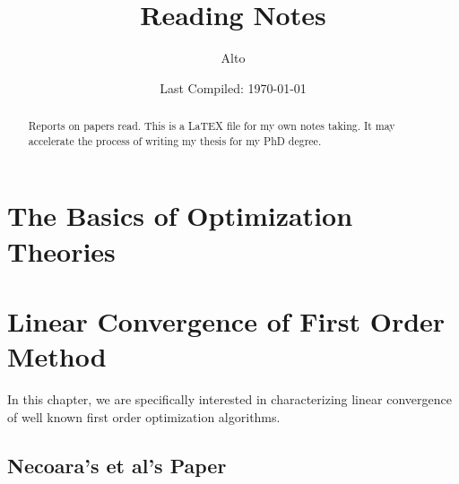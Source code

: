\documentclass[12pt]{report}
\begin{document}
\title{{\selectfont Reading Notes}}

\author{
    Alto
}

\date{Last Compiled: \today}

\maketitle

\begin{abstract} 
    Reports on papers read. 
    This is a LaTEX file for my own notes taking. 
    It may accelerate the process of writing my thesis for my PhD degree. 
\end{abstract}
\chapter{The Basics of Optimization Theories}
    
\chapter{Linear Convergence of First Order Method}
    In this chapter, we are specifically interested in characterizing linear convergence of well known first order optimization algorithms. 
    \section{Necoara's et al's Paper}
\end{document}
